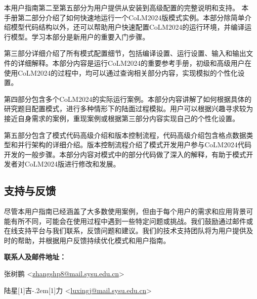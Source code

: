 本用户指南第二至第五部分为用户提供从安装到高级配置的完整说明和支持。
本手册第二部分介绍了如何快速地运行一个CoLM2024版模式实例。本部分除简单介绍模型代码结构以外，还可以帮助用户快速配置CoLM2024的运行环境，并编译运行模型。学习本部分是新用户的重要入门步骤。

第三部分详细介绍了所有模式配置细节，包括编译设置、运行设置、输入和输出文件的详细解释。本部分内容是运行CoLM2024的重要参考手册，初级和高级用户在使用CoLM2024的过程中，均可以通过查询相关部分内容，实现模拟的个性化设置。

第四部分包含多个CoLM2024的实际运行案例。本部分内容讲解了如何根据具体的研究题目配置模式，进行多种情形下的陆面过程模拟。用户可以根据兴趣寻求较为接近自身需求的案例，重现案例或根据第三部分内容实现自己的个性化设置。

第五部分包含了模式代码高级介绍和版本控制流程，代码高级介绍包含格点数据类型和并行架构的详细介绍。版本控制流程介绍了模式开发用户参与CoLM2024代码开发的一般步骤。本部分内容对模式中的部分代码做了深入的解释，有助于模式开发者对CoLM2024版进行修改和发展。

\subsection{支持与反馈}

尽管本用户指南已经涵盖了大多数使用案例，但由于每个用户的需求和应用背景可能有所不同，可能会在使用过程中遇到一些特定问题或挑战。我们鼓励通过邮件或在线支持平台与我们联系，反馈问题和建议。我们的技术支持团队将为用户提供及时的帮助，并根据用户反馈持续优化模式和用户指南。

\textbf{联系人及邮件地址：}

张树鹏 <\url{zhangshp8@mail.sysu.edu.cn}>

陆星\hbox{\scalebox{0.6}[1]{吉}\kern-.2em\scalebox{0.6}[1]{力}} <\url{luxingj@mail.sysu.edu.cn}>
